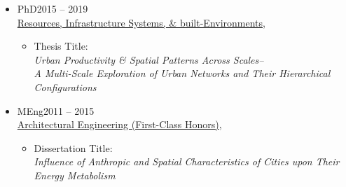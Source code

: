 \documentclass[10pt]{article}
\renewcommand{\section}[1]{\pagebreak[3]%
    \vspace{1.3\baselineskip}%
    \phantomsection\addcontentsline{toc}{section}{#1}%
    \noindent\llap{\large\smash{\parbox[t]{\marginparwidth}{\raggedright #1}}}%
    \vspace{-\baselineskip}\par}
\newenvironment{outerlist}[1][\enskip\textbullet]%
        {\begin{itemize}[#1,leftmargin=*]}{\end{itemize}%
         \vspace{-.6\baselineskip}}
\newenvironment{innerlist}[1][\enskip\textbullet]%
        {\begin{itemize}[#1,leftmargin=*,parsep=0pt,itemsep=0pt,topsep=0pt,partopsep=0pt]}
        {\end{itemize}}
\begin{document}
\begin{outerlist}
	\item[] PhD\hfill {2015 -- 2019}\\
	\href{https://www.sheffield.ac.uk/civil/research/groups/rise-group}
	{Resources, Infrastructure Systems, \& built-Environments}, 
	\begin{innerlist}
		\item[\APLminus] Thesis Title:\\ \emph{Urban Productivity \& Spatial Patterns Across Scales--\\A Multi-Scale Exploration of Urban Networks and Their Hierarchical Configurations}
		
	\end{innerlist}
	\item[] MEng\hfill {2011 -- 2015}\\
	\href{https://www.sheffield.ac.uk/civil/ug/courses/hk2d}
	{Architectural Engineering (First-Class Honors)}, 
	\begin{innerlist}
		\item[\APLminus] Dissertation Title:\\ \emph{Influence of Anthropic and Spatial Characteristics of Cities upon Their Energy Metabolism}
	\end{innerlist}
\end{outerlist}
\end{document}
